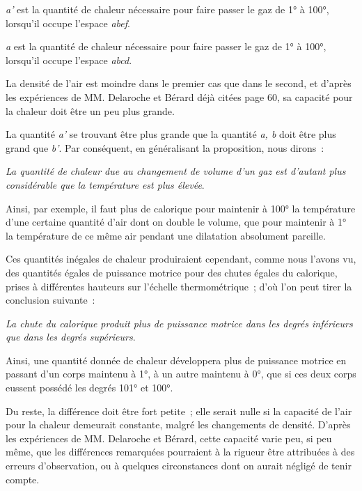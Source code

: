 \documentclass[french,twoside]{book} %
\begin{document}
\noindent \emph{a’} est la quantité de chaleur nécessaire pour faire passer le gaz de 1° à 100°, lorsqu’il occupe l’espace \emph{abef}.\par
\emph{a} est la quantité de chaleur nécessaire pour faire passer le gaz de 1° à 100°, lorsqu’il occupe l’espace \emph{abcd}.\par
La densité de l’air est moindre dans le premier cas que dans le second, et d’après les expériences de MM. Delaroche et Bérard déjà citées page 60, sa capacité pour la chaleur doit être un peu plus grande.\par
La quantité \emph{a’} se trouvant être plus grande que la quantité \emph{a, b} doit être plus grand que \emph{b’}. Par conséquent, en généralisant la proposition, nous dirons :\par
\emph{La quantité de chaleur due au changement de volume d’un gaz est d’autant plus considérable que la température est plus élevée}.\par
Ainsi, par exemple, il faut plus de calorique pour maintenir à 100° la température d’une certaine quantité d’air dont on double le volume, que pour maintenir à 1° la température de ce même air pendant une dilatation absolument pareille.\par
Ces quantités inégales de chaleur produiraient cependant, comme nous l’avons vu, des quantités égales de puissance motrice pour des chutes égales du calorique, prises à différentes hauteurs sur l’échelle thermométrique ; d’où l’on peut tirer la conclusion suivante :\par
\emph{La chute du calorique produit plus de puissance motrice dans les degrés inférieurs que dans les degrés supérieurs}.\par
Ainsi, une quantité donnée de chaleur développera plus de puissance motrice en passant d’un corps maintenu à 1°, à un autre maintenu à 0°, que si ces deux corps eussent possédé les degrés 101° et 100°.\par
Du reste, la différence doit être fort petite ; elle serait nulle si la capacité de l’air pour la chaleur demeurait constante, malgré les changements de densité. D’après les expériences de MM. Delaroche et Bérard, cette capacité varie peu, si peu même, que les différences remarquées pourraient à la rigueur être attribuées à des erreurs d’observation, ou à quelques circonstances dont on aurait négligé de tenir compte.\par
\end{document}
